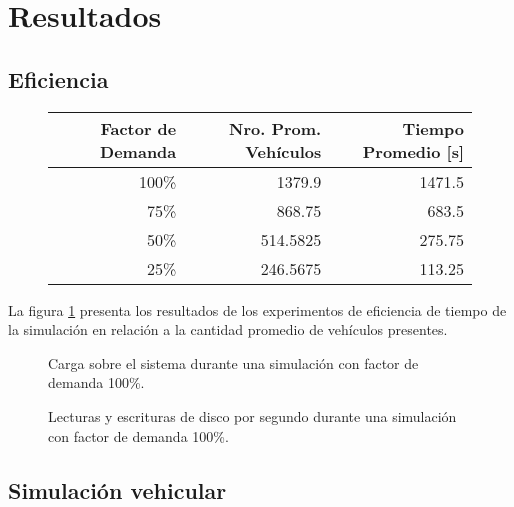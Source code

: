 \section{Resultados}\label{sec:results}
\subsection{Eficiencia}

\begin{figure}[htpb]
    \centering
    \begin{tabular}{@{}rrr@{}}
        \textbf{Factor de Demanda} & \textbf{Nro. Prom. Vehículos} & \textbf{Tiempo Promedio [s]} \\ \midrule
        100\%           & 1379.9          & 1471.5              \\ %
        75\%            & 868.75          & 683.5               \\ %
        50\%            & 514.5825        & 275.75              \\ %
        25\%            & 246.5675        & 113.25              \\ \bottomrule
    \end{tabular}
    \label{table:vehiclesvstime}


    
    \label{fig:vehiclesvstime}
\end{figure}

La figura \ref{fig:vehiclesvstime} presenta los resultados de los experimentos de eficiencia de tiempo de la simulación en relación a la cantidad promedio de vehículos presentes.

\begin{figure}[tpb]
    \centering
    
    \caption{Carga sobre el sistema durante una simulación con factor de demanda 100\%.}
    \label{fig:systemload:cpuram}
\end{figure}
\begin{figure}[tpb]
    \centering
    
    \caption{Lecturas y escrituras de disco por segundo durante una simulación con factor de demanda 100\%.}
    \label{fig:systemload:io}
\end{figure} 


\subsection{Simulación vehicular}

%    
